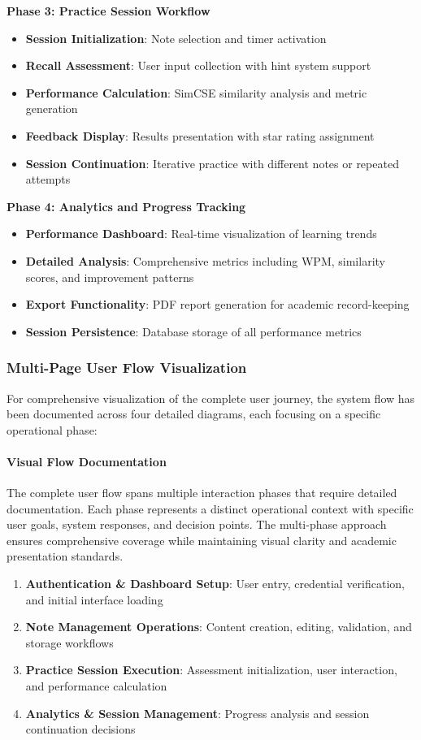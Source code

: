 {{\textbf{Phase 3: Practice Session Workflow}
\begin{itemize}
\item \textbf{Session Initialization}: Note selection and timer activation
\item \textbf{Recall Assessment}: User input collection with hint system support
\item \textbf{Performance Calculation}: SimCSE similarity analysis and metric generation
\item \textbf{Feedback Display}: Results presentation with star rating assignment
\item \textbf{Session Continuation}: Iterative practice with different notes or repeated attempts
\end{itemize}

\textbf{Phase 4: Analytics and Progress Tracking}
\begin{itemize}
\item \textbf{Performance Dashboard}: Real-time visualization of learning trends
\item \textbf{Detailed Analysis}: Comprehensive metrics including WPM, similarity scores, and improvement patterns
\item \textbf{Export Functionality}: PDF report generation for academic record-keeping
\item \textbf{Session Persistence}: Database storage of all performance metrics
\end{itemize}

\subsubsection{Multi-Page User Flow Visualization}

For comprehensive visualization of the complete user journey, the system flow has been documented across four detailed diagrams, each focusing on a specific operational phase:

\paragraph{Visual Flow Documentation}
The complete user flow spans multiple interaction phases that require detailed documentation. Each phase represents a distinct operational context with specific user goals, system responses, and decision points. The multi-phase approach ensures comprehensive coverage while maintaining visual clarity and academic presentation standards.

\begin{enumerate}
\item \textbf{Authentication \& Dashboard Setup}: User entry, credential verification, and initial interface loading
\item \textbf{Note Management Operations}: Content creation, editing, validation, and storage workflows  
\item \textbf{Practice Session Execution}: Assessment initialization, user interaction, and performance calculation
\item \textbf{Analytics \& Session Management}: Progress analysis and session continuation decisions
\end{enumerate}

}}
